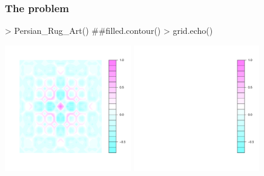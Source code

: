 \documentclass{beamer}
\begin{document}

\begin{frame}[fragile]
\frametitle{The problem}
\begin{Schunk}
\begin{Sinput}
> Persian_Rug_Art() ##filled.contour()
> grid.echo()
\end{Sinput}
\end{Schunk}
\begin{center}
  \includegraphics[height = 5.5cm, width = 5.5cm]{plot/report_fill_1}
  \includegraphics[height = 5.5cm, width = 5.5cm]{plot/report_fill_2}
\end{center}

\end{frame}
\end{document}

